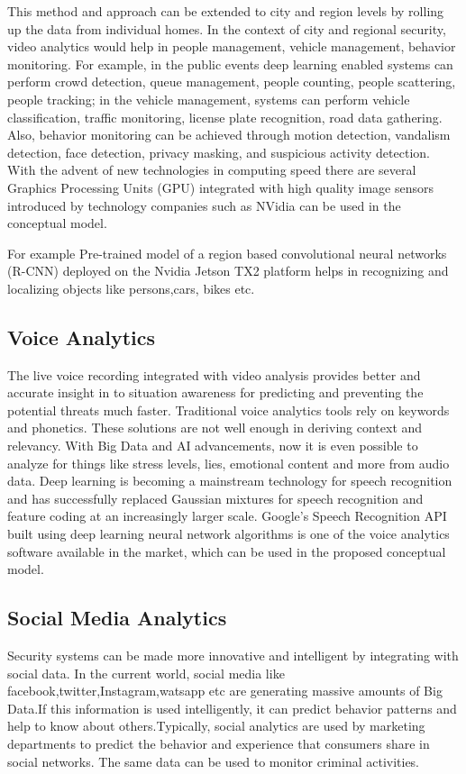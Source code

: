 \documentclass[sigconf]{acmart}
\begin{document}
This method and approach can be extended to city and region levels by rolling up the data from individual homes. In the context of city and regional security, video analytics would help in people management, vehicle management, behavior monitoring. For example, in the public events deep learning enabled systems can  perform crowd detection, queue management, people counting, people scattering, people tracking; in the vehicle management, systems can perform vehicle classification, traffic monitoring, license plate recognition, road data gathering. Also, behavior monitoring can be achieved through motion detection, vandalism detection, face detection, privacy masking, and suspicious activity detection.
With the advent of new technologies in computing speed there are several Graphics Processing Units (GPU) integrated with high quality image sensors  introduced by technology companies such as NVidia can be used in the conceptual model. 

For example Pre-trained model of a region based convolutional neural networks (R-CNN) deployed on the Nvidia Jetson TX2 platform helps in recognizing and localizing objects like persons,cars, bikes etc.

\subsection{Voice Analytics}
The live voice recording integrated with video analysis provides better and accurate insight in to situation awareness for predicting and preventing the potential threats much faster. Traditional voice analytics tools rely on keywords and phonetics. These solutions are not well enough in deriving context and relevancy. With Big Data and AI advancements, now it is even possible to analyze for things like stress levels, lies, emotional content and more from audio data. Deep learning is becoming a mainstream technology for speech recognition and has successfully replaced Gaussian mixtures for speech recognition and feature coding at an increasingly larger scale. Google's Speech Recognition API built using deep learning neural network algorithms is one of the voice analytics software available in the market, which can be used in the proposed conceptual model.

\subsection{Social Media Analytics}
Security systems can be made more innovative and intelligent by integrating with social data. In the current world, social media like facebook,twitter,Instagram,watsapp etc are generating massive amounts of Big Data.If this information is used intelligently, it can predict behavior patterns and help to know about others.Typically, social analytics are used by marketing departments to predict the behavior and experience that consumers share in social networks. The same data can be used to monitor criminal activities.
\end{document}
